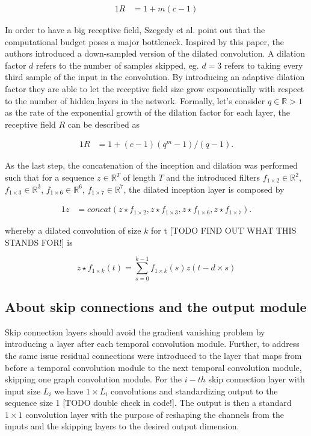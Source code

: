 \documentclass[letterpaper,twocolumn,11pt]{article}
\begin{document}
    \begin{alignat}{1}
        R &= 1 + m(c-1)  \label{eq:receptive_field}
    \end{alignat}

    In order to have a big receptive field, Szegedy et al. \cite{Szegedy_2015_CVPR} point out that the computational budget poses a major bottleneck.
    Inspired by this paper, the authors introduced a down-sampled version of the dilated convolution.
    A dilation factor $d$ refers to the number of samples skipped, eg. $d=3$ refers to taking every third sample of the input in the convolution.
    By introducing an adaptive dilation factor they are able to let the receptive field size grow exponentially with respect to the number of hidden layers in the network.
    Formally, let's consider $q \in \mathbb{R}>1$ as the rate of the exponential growth of the dilation factor for each layer,
    the receptive field $R$ can be described as

    \begin{alignat}{1}
        R &= 1 + (c-1)(q^m-1)/(q-1).  \label{eq:adaptive_receptive_field}
    \end{alignat}


    As the last step, the concatenation of the inception and dilation was performed such that for a sequence $z \in \mathbb{R}^T$ of length $T$ and the introduced filters
    $f_{1 \times 2} \in \mathbb{R}^2$,
    $f_{1 \times 3} \in \mathbb{R}^3$,
    $f_{1 \times 6} \in \mathbb{R}^6$,
    $f_{1 \times 7} \in \mathbb{R}^7$,
    the dilated inception layer is composed by

    \begin{alignat}{1}
        z &= concat(
        z \star f_{1 \times 2},
        z \star f_{1 \times 3},
        z \star f_{1 \times 6},
        z \star f_{1 \times 7}
        ).
        \label{eq:dilated_inception_layer_wrt_z}
    \end{alignat}

    whereby a dilated convolution of size $k$ for t [TODO FIND OUT WHAT THIS STANDS FOR!] is

    \begin{equation}
        z \star f_{1 \times k}(t) = \sum_{s=0}^{k-1} f_{1 \times k}(s)z(t-d \times s)
    \end{equation}

    \subsection{About skip connections and the output module}
    Skip connection layers should avoid the gradient vanishing problem by introducing a layer after each temporal convolution module.
    Further, to address the same issue residual connections were introduced to the layer that maps from before a temporal convolution module to the next temporal convolution module, skipping one graph convolution module.
    For the $i-th$ skip connection layer with input size $L_i$ we have  $1 \times L_i$ convolutions and standardizing output to the sequence size 1 [TODO double check in code!].
    The output is then a standard $ 1 \times 1$ convolution layer with the purpose of reshaping the channels from the inputs and the skipping layers to the desired output dimension.
\end{document}
